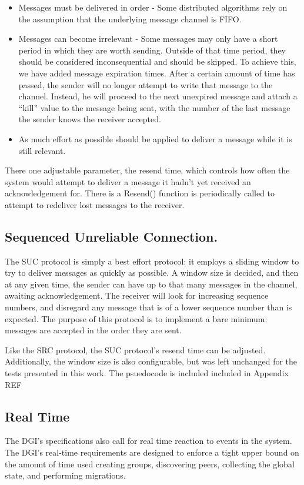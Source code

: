 \begin{itemize}
\item Messages must be delivered in order - Some distributed algorithms rely on 
the assumption that the underlying message channel is FIFO.
\item Messages can become irrelevant - Some messages may only have a short 
period in which they are worth sending. Outside of that time period, they 
should be considered inconsequential and should be skipped. To achieve this, we 
have added message expiration times. After a certain amount of time has passed, 
the sender will no longer attempt to write that message to the channel. 
Instead, he will proceed to the next unexpired message and attach a ``kill'' 
value to the message being sent, with the number of the last message the sender 
knows the receiver accepted.
\item As much effort as possible should be applied to deliver a message while 
it is still relevant.
\end{itemize}

There one adjustable parameter, the resend time, which controls how often the 
system would attempt to deliver a message it hadn't yet received an 
acknowledgement for. There is a Resend() function is periodically called to attempt to redeliver
lost messages to the receiver. 

\subsection{Sequenced Unreliable Connection.}

The SUC protocol is simply a best effort protocol: it employs a sliding window 
to try to deliver messages as quickly as possible. A window size is decided, 
and then at any given time, the sender can have up to that many messages in the 
channel, awaiting acknowledgement. The receiver will look for increasing 
sequence numbers, and disregard any message that is of a lower sequence number 
than is expected. The purpose of this protocol is to implement a bare minimum: 
messages are accepted in the order they are sent.

Like the SRC protocol, the SUC protocol's resend time can be adjusted. 
Additionally, the window size is also configurable, but was left unchanged for 
the tests presented in this work. The psuedocode is included included in Appendix REF

\subsection{Real Time}
The DGI's specifications also call for real time reaction to events in the
system. The DGI's real-time requirements are designed to enforce a tight
upper bound on the amount of time used creating groups, discovering peers,
collecting the global state, and performing migrations.

